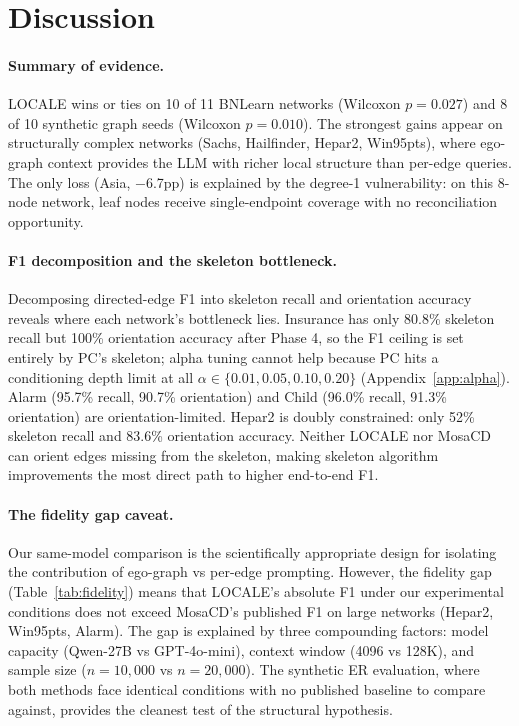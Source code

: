 \documentclass{article}
\begin{document}
\section{Discussion}

\paragraph{Summary of evidence.}
LOCALE wins or ties on 10 of 11 BNLearn networks (Wilcoxon $p{=}0.027$) and 8 of 10 synthetic graph seeds (Wilcoxon $p{=}0.010$). The strongest gains appear on structurally complex networks (Sachs, Hailfinder, Hepar2, Win95pts), where ego-graph context provides the LLM with richer local structure than per-edge queries. The only loss (Asia, $-$6.7pp) is explained by the degree-1 vulnerability: on this 8-node network, leaf nodes receive single-endpoint coverage with no reconciliation opportunity.

\paragraph{F1 decomposition and the skeleton bottleneck.}
Decomposing directed-edge F1 into skeleton recall and orientation accuracy reveals where each network's bottleneck lies. Insurance has only 80.8\% skeleton recall but 100\% orientation accuracy after Phase 4, so the F1 ceiling is set entirely by PC's skeleton; alpha tuning cannot help because PC hits a conditioning depth limit at all $\alpha \in \{0.01, 0.05, 0.10, 0.20\}$ (Appendix~\ref{app:alpha}). Alarm (95.7\% recall, 90.7\% orientation) and Child (96.0\% recall, 91.3\% orientation) are orientation-limited. Hepar2 is doubly constrained: only 52\% skeleton recall and 83.6\% orientation accuracy. Neither LOCALE nor MosaCD can orient edges missing from the skeleton, making skeleton algorithm improvements the most direct path to higher end-to-end F1.

\paragraph{The fidelity gap caveat.}
Our same-model comparison is the scientifically appropriate design for isolating the contribution of ego-graph vs per-edge prompting. However, the fidelity gap (Table~\ref{tab:fidelity}) means that LOCALE's absolute F1 under our experimental conditions does not exceed MosaCD's published F1 on large networks (Hepar2, Win95pts, Alarm). The gap is explained by three compounding factors: model capacity (Qwen-27B vs GPT-4o-mini), context window (4096 vs 128K), and sample size ($n{=}10{,}000$ vs $n{=}20{,}000$). The synthetic ER evaluation, where both methods face identical conditions with no published baseline to compare against, provides the cleanest test of the structural hypothesis.
\end{document}
